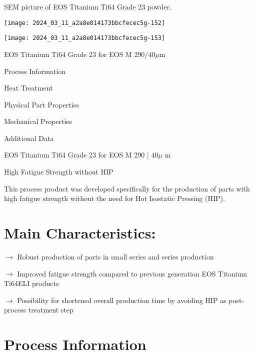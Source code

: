 \documentclass[10pt]{article}
\begin{document}
SEM picture of EOS Titanium Ti64 Grade 23 powder.

\begin{center}
\texttt{[image: 2024\_03\_11\_a2a8e014173bbcfecec5g-152]}
\end{center}

\begin{center}
\texttt{[image: 2024\_03\_11\_a2a8e014173bbcfecec5g-153]}
\end{center}

EOS Titanium Ti64 Grade 23 for EOS M $290 / 40 \mu \mathrm{m}$

Process Information

Heat Treatment

Physical Part Properties

Mechanical Properties

Additional Data

EOS Titanium Ti64 Grade 23 for EOS M 290 | $40 \mu$ m

High Fatigue Strength without HIP

This process product was developed specifically for the production of parts with high fatigue strength without the need for Hot Isostatic Pressing (HIP).

\section*{Main Characteristics:}
$\longrightarrow$ Robust production of parts in small series and series production

$\longrightarrow$ Improved fatigue strength compared to previous generation EOS Titanium Ti64ELI products

$\longrightarrow$ Possibility for shortened overall production time by avoiding HIP as post-process treatment step

\section*{Process Information}
\end{document}
